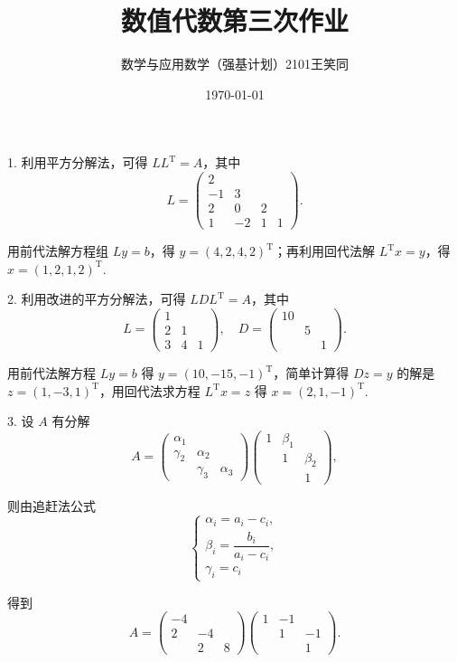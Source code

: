 \documentclass[UTF8]{ctexart}
\title{\vspace{-2cm}数值代数第三次作业}
\author{数学与应用数学（强基计划）2101\quad 王笑同\quad 3210105450}
\date{\today}
\begin{document}
\maketitle

\pagestyle{plain}

1. 利用平方分解法，可得 $LL^{\mathrm{T}}=A$，其中
\[L=\begin{pmatrix}
    2\\
    -1 & 3\\
    2 & 0 & 2\\
    1 & -2 & 1 & 1
\end{pmatrix}.\]

用前代法解方程组 $Ly=b$，得 $y=(4,2,4,2)^{\mathrm{T}}$；再利用回代法解 $L^{\mathrm{T}}x=y$，得 $x=(1,2,1,2)^{\mathrm{T}}$.

\quad

2. 利用改进的平方分解法，可得 $LDL^{\mathrm{T}}=A$，其中
\[L=\begin{pmatrix}
    1\\
    2&1\\
    3&4&1
\end{pmatrix},\quad D=\begin{pmatrix}
    10\\
    &5\\
    &&1
\end{pmatrix}.\]

用前代法解方程 $Ly=b$ 得 $y=(10,-15,-1)^{\mathrm{T}}$，简单计算得 $Dz=y$ 的解是 $z=(1,-3,1)^{\mathrm{T}}$，用回代法求方程 $L^{\mathrm{T}}x=z$ 得 $x=(2,1,-1)^{\mathrm{T}}$.

\quad

3. 设 $A$ 有分解
\[A=\begin{pmatrix}
    \alpha_1\\
    \gamma_2&\alpha_2\\
    &\gamma_3&\alpha_3
\end{pmatrix}\begin{pmatrix}
    1&\beta_1\\
    &1&\beta_2\\
    &&1
\end{pmatrix},\]

则由追赶法公式
\[\begin{cases}
    \alpha_i=a_i-c_i,\\
    \beta_i=\dfrac{b_i}{a_i-c_i},\\
    \gamma_i=c_i
\end{cases}\]

得到
\[A=\begin{pmatrix}
    -4\\
    2&-4\\
    &2&8
\end{pmatrix}\begin{pmatrix}
    1&-1\\
    &1&-1\\
    &&1
\end{pmatrix}.\]
\end{document}

